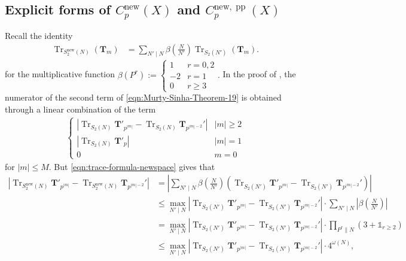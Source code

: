 \documentclass[11pt,letterpaper,reqno]{amsart}
\theoremstyle{definition}
\numberwithin{equation}{section}
\numberwithin{figure}{section}
\numberwithin{table}{section}
\let\subsectiontemp\subsection
\renewcommand{\subsection}[1]{ 
    \subsectiontemp{#1} \hfill\vspace{0.5\linespacing} 
}
\newcommand{\nw}{\mathrm{new}}
\begin{document}
\subsection{Explicit forms of \texorpdfstring{$C_p^{\nw}(X)$}{Cp(new)(X)} and \texorpdfstring{$C_p^{\nw, \operatorname{pp}}(X)$}{Cp(new pp)(X)}} \label{subsection:explicit-form-newspace}

Recall the identity \cite[Theorem 13.5.7]{cohen2017modular}
\begin{align}
    \operatorname{Tr}_{S_2^\nw(N)} (\mathbf{T}_m) &= \sum_{N' \mid N} \beta\left( \frac{N}{N'} \right) \operatorname{Tr}_{S_2(N')}(\mathbf{T}_m) \label{eqn:trace-formula-newspace}.
\end{align}
for the multiplicative function $\beta(P^r) := \begin{cases}
        1 & r = 0, 2\\
        -2 & r = 1\\
        0 & r \geq 3
    \end{cases}.$ In the proof of \cite[Theorem 19]{MS07}, the numerator of the second term of \eqref{eqn:Murty-Sinha-Theorem-19} is obtained through a linear combination of the term
\begin{align}
    \begin{cases}
        \left| 
        \operatorname{Tr}_{S_2(N)} \mathbf{T}'_{p^{|m|}} - \operatorname{Tr}_{S_2(N)}\mathbf{T}_{p^{|m| - 2}}' \right| & |m| \geq 2\\
        \left| \operatorname{Tr}_{S_2(N)} \mathbf{T}'_{p} \right| & |m| = 1\\
        0 & m = 0
    \end{cases}
\end{align}
for $|m| \leq M.$ But \eqref{eqn:trace-formula-newspace} gives that
\begin{align}
    \left| 
        \operatorname{Tr}_{S_2^\nw (N)} \mathbf{T}'_{p^{|m|}} - \operatorname{Tr}_{S_2^\nw(N)}\mathbf{T}_{p^{|m| - 2}}' \right| &= \left|  \sum_{N' \mid N} \beta\left( \frac{N}{N'} \right) \left( \operatorname{Tr}_{S_2(N')} \mathbf{T}'_{p^{|m|}} - \operatorname{Tr}_{S_2(N')}\mathbf{T}_{p^{|m| - 2}}' \right) \right|\\
        &\leq \max_{N' \mid N} \left|\operatorname{Tr}_{S_2(N')} \mathbf{T}'_{p^{|m|}} - \operatorname{Tr}_{S_2(N')}\mathbf{T}_{p^{|m| - 2}}' \right| \cdot \sum_{N' \mid N} \left| \beta \left( \frac{N}{N'} \right) \right|\\
        &= \max_{N' \mid N} \left|\operatorname{Tr}_{S_2(N')} \mathbf{T}'_{p^{|m|}} - \operatorname{Tr}_{S_2(N')}\mathbf{T}_{p^{|m| - 2}}' \right| \cdot \prod_{P^r \| N} \left(3 + \mathds{1}_{r \geq 2} \right)\\
        &\leq \max_{N' \mid N} \left|\operatorname{Tr}_{S_2(N')} \mathbf{T}'_{p^{|m|}} - \operatorname{Tr}_{S_2(N')}\mathbf{T}_{p^{|m| - 2}}' \right| \cdot 4^{\omega(N)},
\end{align}
\end{document}
